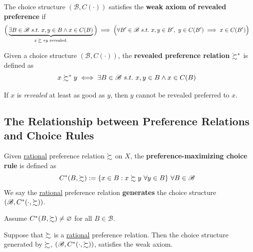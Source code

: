 \documentclass{report}
\begin{document}
		\begin{definition}[1.C.1]
			The choice structure $(\mathscr{B}, C(\cdot))$ satisfies the \textbf{weak axiom of revealed preference} if
			\begin{equation}
				\Big(\underbrace{
					\exists B \in \mathscr{B}\ s.t.\ x, y \in B \land x \in C(B)
					}_{\text{{$x \succsim* y$ revealed.}}}
				\Big)
				\implies 
				\Big(
					\forall B' \in \mathscr{B}\ s.t.\ x, y \in B',\ y \in C(B') \implies x \in C(B')
				\Big)
			\end{equation}
		\end{definition}
		
		\begin{definition}
			Given a choice structure $(\mathscr{B}, C(\cdot))$, the \textbf{revealed preference relation} $\succsim^*$ is defined as
			\begin{equation}
				x \pref^* y \iff \exists B \in \mathscr{B}\ s.t.\ x, y \in B \land x \in C(B)
			\end{equation}
		\end{definition}
		
		\begin{remark}
			If $x$ is \emph{revealed} at least as good as $y$, then $y$ cannot be revealed preferred to $x$.
		\end{remark}
	
	\subsection{The Relationship between Preference Relations and Choice Rules}
		\begin{definition}
			Given \ul{rational} preference relation $\succsim$ on $X$, the \textbf{preference-maximizing choice rule} is defined as 
			\begin{equation}
				C^*(B, \pref) := \{x \in B: x \pref y\ \forall y \in B\}\ \forall B \in \mathscr{B}
			\end{equation}
			We say the \ul{rational} preference relation \textbf{generates} the choice structure $(\mathscr{B}, C^*(\cdot, \succsim))$.
		\end{definition}
		
		\begin{assumption}
			Assume $C^*(B, \succsim) \neq \varnothing$ for all $B \in \mathscr{B}$.
		\end{assumption}
		
		\begin{proposition}
			Suppose that $\succsim$ is a \ul{rational} preference relation. Then the choice structure generated by $\succsim$, $(\mathscr{B}, C^*(\cdot, \succsim))$, satisfies the weak axiom.
		\end{proposition}
		
\end{document}
